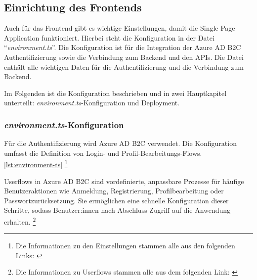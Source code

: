 \subsection{Einrichtung des Frontends}

Auch für das Frontend gibt es wichtige Einstellungen, damit die Single Page Application
funktioniert. Hierbei steht die Konfiguration in der Datei ``\emph{environment.ts}''.
Die Konfiguration ist für die Integration der Azure AD B2C Authentifizierung sowie die 
Verbindung zum Backend und den APIs. Die Datei enthält alle wichtigen Daten für 
die Authentifizierung und die Verbindung zum Backend. 

Im Folgenden ist die Konfiguration beschrieben und in zwei Hauptkapitel unterteilt: 
\emph{environment.ts}-Konfiguration und Deployment.


\subsubsection{\emph{environment.ts}-Konfiguration}

Für die Authentifizierung wird Azure AD B2C verwendet. Die Konfiguration umfasst 
die Definition von Login- und Profil-Bearbeitungs-Flows. \ref{lst:environment-ts}
\footnote{Die Informationen zu den Einstellungen stammen alle aus den folgenden Links: \cite{MicrosoftCorporationh} \cite{MicrosoftCorporationg}}

Userflows in Azure AD B2C sind vordefinierte, anpassbare Prozesse für häufige Benutzeraktionen 
wie Anmeldung, Registrierung, Profilbearbeitung oder Passwortzurücksetzung. Sie ermöglichen 
eine schnelle Konfiguration dieser Schritte, sodass Benutzer:innen nach Abschluss Zugriff auf 
die Anwendung erhalten.
\footnote{Die Informationen zu Userflows stammen alle aus dem folgenden Link: \cite{MicrosoftCorporationn}}

